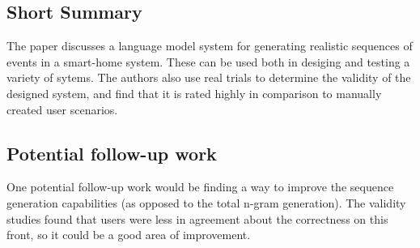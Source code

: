 \documentclass[11pt]{article}
\begin{document}
\subsection*{Short Summary}

The paper discusses a language model system for generating realistic sequences of events in a smart-home system.
These can be used both in desiging and testing a variety of sytems.
The authors also use real trials to determine the validity of the designed system, and find that it is rated highly in comparison to manually created user scenarios.

\subsection*{Potential follow-up work}

One potential follow-up work would be finding a way to improve the sequence generation capabilities (as opposed to the total n-gram generation).
The validity studies found that users were less in agreement about the correctness on this front, so it could be a good area of improvement.
\end{document}
